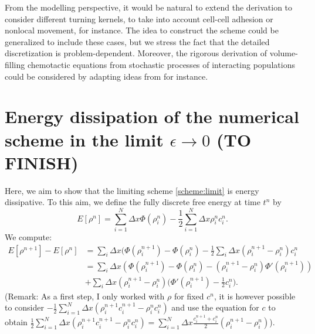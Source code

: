 \documentclass[review,onefignum,onetabnum]{siamart220329}
\newcommand{\DP}{\color{myblue}}
\begin{document}
{From the modelling perspective, it would be natural to extend the derivation to consider different turning kernels, to take into account cell-cell adhesion or nonlocal movement, for instance. The idea to construct the scheme could be generalized to include these cases, but we stress the fact that the detailed discretization is problem-dependent. %
Moreover, the rigorous derivation of volume-filling chemotactic equations from stochastic processes of interacting populations could be considered by adapting ideas from \cite{stevens2000derivation} for instance. 
}


\appendix

{\DP
\section{Energy dissipation of the numerical scheme in the limit $\epsilon \rightarrow 0$ (TO FINISH)}

Here, we aim to show that the limiting scheme \eqref{scheme:limit} is energy dissipative. To this aim, we define the fully discrete free energy at time $t^n$ by
$$
E[\rho^n] = \sum_{i=1}^N \Delta x \Phi(\rho_i^n) - \frac{1}{2} \sum_{i=1}^N \Delta x \rho_i^n c_i^n.
$$
We compute:
\begin{equation*}
\begin{split}
E[\rho^{n+1}] - E[\rho^n] &= \sum_i \Delta x (\Phi(\rho_i^{n+1}) - \Phi(\rho_i^n) - \frac{1}{2} \sum_i \Delta x (\rho_i^{n+1} - \rho_i^n) c_i^n\\
& = \sum_i \Delta x (\Phi(\rho_i^{n+1}) - \Phi(\rho_i^{n}) - (\rho_i^{n+1} - \rho_i^n)\Phi'(\rho_i^{n+1})) \\
&+ \sum_i \Delta x (\rho_i^{n+1} - \rho_i^n) \big( \Phi'(\rho_i^{n+1}) - \frac{1}{2} c_i^n ).
\end{split}
\end{equation*}
(Remark: As a first step, I only worked with $\rho$ for fixed $c^n$, it is however possible to consider $- \frac{1}{2} \sum_{i=1}^N \Delta x (\rho_i^{n+1} c_i^{n+1} - \rho_i^n c_i^n)$ and use the equation for $c$ to obtain $\frac{1}{2} \sum_{i=1}^N \Delta x (\rho_i^{n+1} c_i^{n+1} - \rho_i^n c_i^n) = \sum_{i=1}^N \Delta x \frac{c_i^{n+1} + c_i^n}{2}(\rho_i^{n+1} - \rho_i^n)$). 

}
\end{document}
